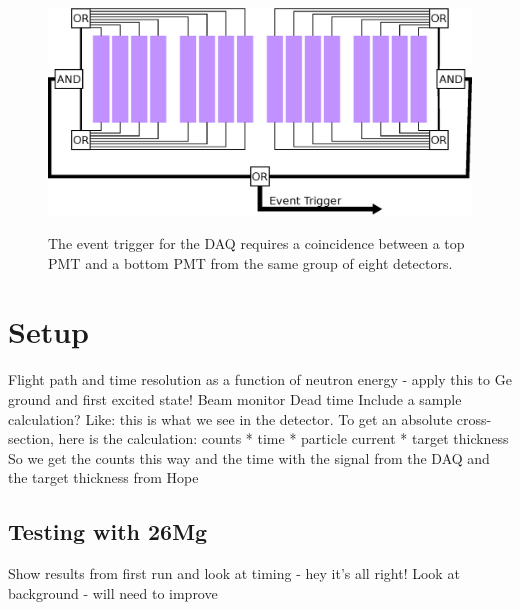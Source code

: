 \begin{figure}[htp]
\centering
\includegraphics[width=1.0\textwidth]{figures/event_trigger.eps}
\label{fig:eventTrig}
\caption{The event trigger for the DAQ requires a coincidence between a top PMT and a bottom PMT from the same group of eight detectors.}
\end{figure}


\section{Setup}
Flight path and time resolution as a function of neutron energy - apply this to Ge ground and first excited state!
Beam monitor
Dead time
Include a sample calculation?  Like: this is what we see in the detector.  To get an absolute cross-section, here is the calculation:
counts * time * particle current * target thickness
So we get the counts this way and the time with the signal from the DAQ and the target thickness from Hope



\subsection{Testing with 26Mg}
Show results from first run and look at timing - hey it's all right!
Look at background - will need to improve

%
% 
% 
